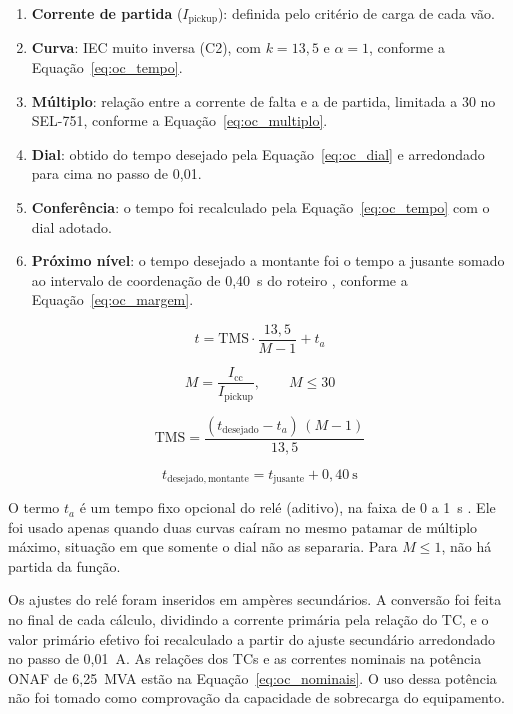 \begin{enumerate}
    \item \textbf{Corrente de partida} ($I_{\mathrm{pickup}}$): definida pelo critério de carga de cada vão.
    \item \textbf{Curva}: IEC muito inversa (C2), com $k=13{,}5$ e $\alpha=1$, conforme a Equação~\eqref{eq:oc_tempo}.
    \item \textbf{Múltiplo}: relação entre a corrente de falta e a de partida, limitada a 30 no SEL-751, conforme a Equação~\eqref{eq:oc_multiplo}.
    \item \textbf{Dial}: obtido do tempo desejado pela Equação~\eqref{eq:oc_dial} e arredondado para cima no passo de 0,01.
    \item \textbf{Conferência}: o tempo foi recalculado pela Equação~\eqref{eq:oc_tempo} com o dial adotado.
    \item \textbf{Próximo nível}: o tempo desejado a montante foi o tempo a jusante somado ao intervalo de coordenação de 0,40~s do roteiro \cite{sampaio2026roteiro}, conforme a Equação~\eqref{eq:oc_margem}.
\end{enumerate}

\begin{equation}
    t=\mathrm{TMS}\cdot\frac{13{,}5}{M-1}+t_a
    \label{eq:oc_tempo}
\end{equation}

\begin{equation}
    M=\frac{I_{\mathrm{cc}}}{I_{\mathrm{pickup}}},\qquad M\leq30
    \label{eq:oc_multiplo}
\end{equation}

\begin{equation}
    \mathrm{TMS}=\frac{(t_{\mathrm{desejado}}-t_a)\,(M-1)}{13{,}5}
    \label{eq:oc_dial}
\end{equation}

\begin{equation}
    t_{\mathrm{desejado,montante}}=t_{\mathrm{jusante}}+0{,}40~\mathrm{s}
    \label{eq:oc_margem}
\end{equation}

O termo $t_a$ é um tempo fixo opcional do relé (aditivo), na faixa de 0 a 1~s \cite{sel2024sel751}. Ele foi usado apenas quando duas curvas caíram no mesmo patamar de múltiplo máximo, situação em que somente o dial não as separaria. Para $M\leq1$, não há partida da função.

Os ajustes do relé foram inseridos em ampères secundários. A conversão foi feita no final de cada cálculo, dividindo a corrente primária pela relação do TC, e o valor primário efetivo foi recalculado a partir do ajuste secundário arredondado no passo de 0,01~A. As relações dos TCs e as correntes nominais na potência ONAF de 6,25~MVA estão na Equação~\eqref{eq:oc_nominais}. O uso dessa potência não foi tomado como comprovação da capacidade de sobrecarga do equipamento.

